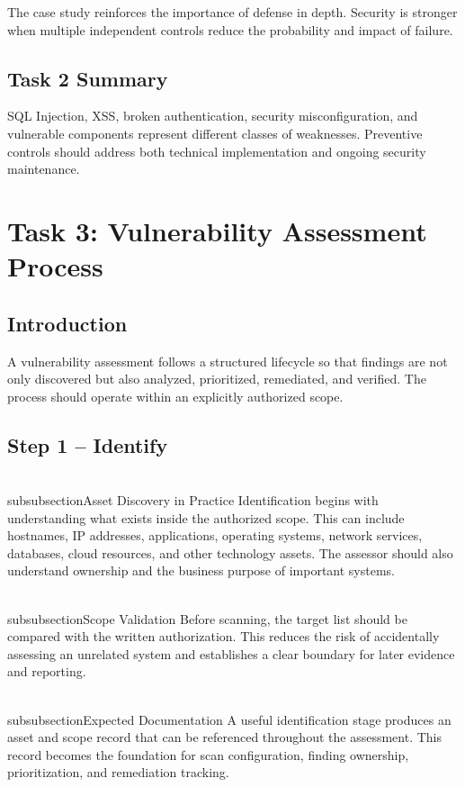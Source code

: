 \documentclass[11pt,a4paper]{article}
\begin{document}
The case study reinforces the importance of defense in depth. Security is stronger when multiple independent controls reduce the probability and impact of failure.

\subsection{Task 2 Summary}
SQL Injection, XSS, broken authentication, security misconfiguration, and vulnerable components represent different classes of weaknesses. Preventive controls should address both technical implementation and ongoing security maintenance.

\newpage
\section{Task 3: Vulnerability Assessment Process}

\subsection{Introduction}
A vulnerability assessment follows a structured lifecycle so that findings are not only discovered but also analyzed, prioritized, remediated, and verified. The process should operate within an explicitly authorized scope.


\subsection{Step 1 – Identify}
\\subsubsection{Asset Discovery in Practice}
Identification begins with understanding what exists inside the authorized scope. This can include hostnames, IP addresses, applications, operating systems, network services, databases, cloud resources, and other technology assets. The assessor should also understand ownership and the business purpose of important systems.

\\subsubsection{Scope Validation}
Before scanning, the target list should be compared with the written authorization. This reduces the risk of accidentally assessing an unrelated system and establishes a clear boundary for later evidence and reporting.

\\subsubsection{Expected Documentation}
A useful identification stage produces an asset and scope record that can be referenced throughout the assessment. This record becomes the foundation for scan configuration, finding ownership, prioritization, and remediation tracking.
\end{document}
